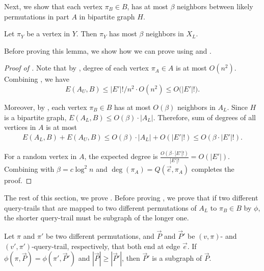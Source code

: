 Next, we show that each vertex $\pi_B \in B$, has at most $\beta$ neighbors between likely permutations in part $A$ in bipartite graph $H$.

\begin{lemma}\label{lem: few-likely-neighbors}
Let $\pi_Y$ be a vertex in $Y$. Then $\pi_Y$ has most $\beta$ neighbors in $X_L$. 
\end{lemma}


Before proving this lemma, we show how we can prove  using  and .

\begin{proof}[Proof of ]
Note that by , degree of each vertex $\pi_A \in A$ is at most $O(n^2)$. Combining , we have
$$E(A_U, B) \leq |E'|! / n^2 \cdot O(n^2) \leq O\big(|E'|!).$$


Moreover, by , each vertex $\pi_B \in B$ has at most $O(\beta)$ neighbors in $A_L$. Since $H$ is a bipartite graph,  $E(A_L, B) \leq O(\beta)\cdot |A_L|$. Therefore, sum of degrees of all vertices in $A$ is at most 
\begin{align*}
    E(A_L, B) + E(A_U, B) \leq O(\beta)\cdot|A_L| + O(|E'|!) \leq O(\beta\cdot|E'|!).
\end{align*}

For a random vertex in $A$, the expected degree is $\frac{O(\beta \cdot |E'|!)}{|E'|!} = O(|E'|)$. Combining with $\beta = c\log^2 n$ and $\deg(\pi_A) = Q(\vec{e},\pi_A)$ completes the proof.
\end{proof}




The rest of this section, we prove . Before proving , we prove that if two different query-trails that are mapped to two different permutations of $A_L$ to $\pi_B \in B$ by $\phi$, the shorter query-trail must be subgraph of the longer one.

\begin{lemma}\label{lem:no-branch}
Let $\pi$ and $\pi'$ be two different permutations, and $\vec{P}$ and $\vec{P}'$ be $(v,\pi)$- and $(v',\pi')$-query-trail, respectively, that both end at edge $\vec{e}$. If $\phi(\pi,\vec{P})=\phi(\pi',\vec{P}')$ and $|\vec{P}| \geq |\vec{P}'|$, then $\vec{P}'$ is a subgraph of $\vec{P}$.
\end{lemma}

